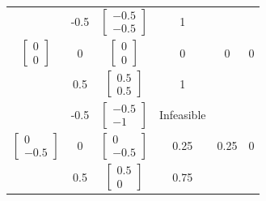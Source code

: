 \documentclass[14pt, a4paper]{extarticle}
\begin{document}
\begin{latin}
\begin{longtable}{|c|c|c|c|c|c|}
			&          -0.5              &$\begin{bmatrix} -0.5 \\ -0.5 \end{bmatrix}$      &        1             &      &        \\  \cline{2-4} 
		\multirow{-3}{*}{$\begin{bmatrix} 0 \\ 0 \end{bmatrix}$}&       0                 &$\begin{bmatrix} 0 \\ 0 \end{bmatrix}$      &     0                   &        0        &0  \\  \cline{2-4} 
			&           0.5             &$\begin{bmatrix} 0.5 \\ 0.5 \end{bmatrix}$      &             1            &           &  \\  \cline{2-4} \hline
		
			& -0.5 &$\begin{bmatrix} -0.5 \\ -1 \end{bmatrix}$      & Infeasible                        &             &      \\ \cline{2-4}
		\multirow{-3}{*}{$\begin{bmatrix} 0 \\ -0.5 \end{bmatrix}$}& 0    &$\begin{bmatrix} 0 \\ -0.5 \end{bmatrix}$      &     0.25                   &    0.25        &  0     \\ \cline{2-4}
			& 0.5  &$\begin{bmatrix} 0.5 \\ 0 \end{bmatrix}$      &    0.75                     &          &       \\ \hline
		

\end{longtable}
\end{latin}
\end{document}

